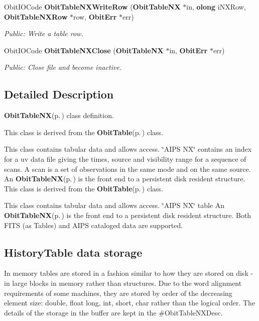 \begin{CompactItemize}
Obit\-IOCode {\bf Obit\-Table\-NXWrite\-Row} ({\bf Obit\-Table\-NX} $\ast$in, {\bf olong} i\-NXRow, {\bf Obit\-Table\-NXRow} $\ast$row, {\bf Obit\-Err} $\ast$err)
\begin{CompactList}\small\item\em Public: Write a table row. \item\end{CompactList}\item 
Obit\-IOCode {\bf Obit\-Table\-NXClose} ({\bf Obit\-Table\-NX} $\ast$in, {\bf Obit\-Err} $\ast$err)
\begin{CompactList}\small\item\em Public: Close file and become inactive. \item\end{CompactList}\end{CompactItemize}


\subsection{Detailed Description}
{\bf Obit\-Table\-NX}{\rm (p.\,\pageref{structObitTableNX})} class definition. 

This class is derived from the {\bf Obit\-Table}{\rm (p.\,\pageref{structObitTable})} class.

This class contains tabular data and allows access. \char`\"{}AIPS NX\char`\"{} contains an index for a uv data file giving the times, source and visibility range for a sequence of scans. A scan is a set of observations in the same mode and on the same source. An {\bf Obit\-Table\-NX}{\rm (p.\,\pageref{structObitTableNX})} is the front end to a persistent disk resident structure. This class is derived from the {\bf Obit\-Table}{\rm (p.\,\pageref{structObitTable})} class.

This class contains tabular data and allows access. \char`\"{}AIPS NX\char`\"{} table An {\bf Obit\-Table\-NX}{\rm (p.\,\pageref{structObitTableNX})} is the front end to a persistent disk resident structure. Both FITS (as Tables) and AIPS cataloged data are supported.\subsection{History\-Table data storage}\label{ObitTableWX_8h_TableDataStorage}
In memory tables are stored in a fashion similar to how they are stored on disk - in large blocks in memory rather than structures. Due to the word alignment requirements of some machines, they are stored by order of the decreasing element size: double, float long, int, short, char rather than the logical order. The details of the storage in the buffer are kept in the \#Obit\-Table\-NXDesc.

